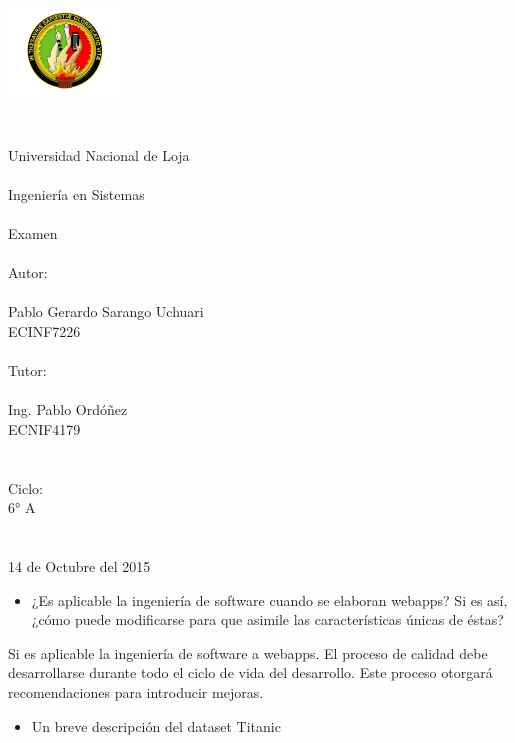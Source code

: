 \documentclass[a4paper]{article}
\begin{document}

\begin{center}
\includegraphics[width=3cm, height=3cm]{unl-logo.jpg}\\\
\end{center}
\begin{center}
   \huge{}
 Universidad Nacional de Loja \\ \ \\
 Ingeniería en Sistemas\\ \ \\
 Examen\\ \ \\
 Autor:\\ \ \\ 
 Pablo Gerardo Sarango Uchuari\\
 ECINF7226\\ \ \\ 
 Tutor:\\ \ \\ 
 Ing. Pablo Ordóñez\\
 ECNIF4179\\ \ \\ \ \\ 
 Ciclo: \\
 6° A\\ \ \\ \ \\ 
 14 de Octubre del 2015
 \end{center}

\newpage
\begin{itemize}
\item ¿Es aplicable la ingeniería de software cuando se elaboran webapps? Si es así, ¿cómo puede
modificarse para que asimile las características únicas de éstas?
\end{itemize}
Si es aplicable la ingeniería de software a webapps. El proceso de calidad debe desarrollarse durante todo el ciclo de vida del desarrollo. Este proceso otorgará recomendaciones para introducir mejoras.

\begin{itemize}
\item Un breve descripción del dataset Titanic
\end{itemize}
\end{document}
